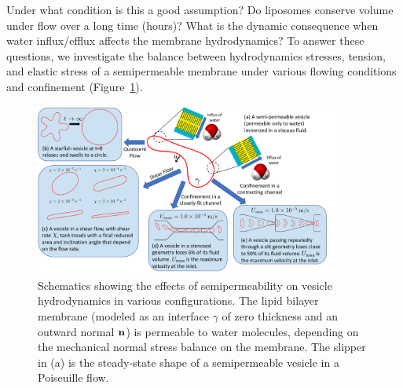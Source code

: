 \documentclass[prb,preprint,showpacs,preprintnumbers,amsmath,amssymb,longbibliography]{revtex4-1}
\begin{document}
Under what condition is this a good assumption? Do liposomes conserve
volume under flow over a long time (hours)? What is the dynamic consequence when water
influx/efflux affects the membrane hydrodynamics? To answer these
questions, we investigate the balance between hydrodynamics stresses,
tension, and elastic stress of a semipermeable membrane under various
flowing conditions and confinement (Figure~\ref{fig:sketch}).
%
\begin{figure}[htp]
  \centering
  \includegraphics[width=0.9\textwidth]{figures/schematic.pdf}
  \caption{\label{fig:sketch} Schematics showing the effects of
  semipermeability on vesicle hydrodynamics in various configurations. 
  The lipid bilayer membrane (modeled as an interface $\gamma$ of zero
  thickness and an outward normal $\mathbf{n}$) is permeable to water
  molecules, depending on the mechanical normal stress balance on the
  membrane.  The slipper in (a) is the steady-state shape of a
  semipermeable vesicle in a Poiseuille flow.}
\end{figure}
%
\end{document}
